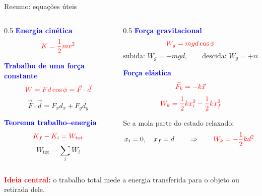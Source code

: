 \documentclass{beamer}
\begin{document}
	\begin{frame}{Resumo: equações úteis}
		\scriptsize
		
		\begin{columns}[T]
			\begin{column}{0.5\textwidth}
				\textcolor{blue}{\textbf{Energia cinética}}
				\[
				\textcolor{red}{K=\frac12mv^2}
				\]
				
				\textcolor{blue}{\textbf{Trabalho de uma força constante}}
				\[
				\textcolor{red}{W=Fd\cos\phi=\vec F\cdot\vec d}
				\]
				\[
				\vec F\cdot\vec d=F_xd_x+F_yd_y
				\]
				
				\textcolor{blue}{\textbf{Teorema trabalho--energia}}
				\[
				\textcolor{red}{K_f-K_i=W_{\text{tot}}}
				\]
				\[
				W_{\text{tot}}=\sum_i W_i
				\]
			\end{column}
			
			\begin{column}{0.5\textwidth}
				\textcolor{blue}{\textbf{Força gravitacional}}
				\[
				\textcolor{red}{W_g=mgd\cos\phi}
				\]
				\[
				\text{subida: } W_g=-mgd,
				\qquad
				\text{descida: } W_g=+mgd.
				\]
				
				\textcolor{blue}{\textbf{Força elástica}}
				\[
				\textcolor{red}{\vec F_k=-k\vec x}
				\]
				\[
				\textcolor{red}{W_k=\frac12kx_i^2-\frac12kx_f^2}
				\]
				
				Se a mola parte do estado relaxado:
				\[
				x_i=0,\quad x_f=d
				\qquad \Rightarrow \qquad
				\textcolor{red}{W_k=-\frac12kd^2.}
				\]
			\end{column}
		\end{columns}
		
		\vspace{0.15cm}
		\centering
		\textcolor{red}{\textbf{Ideia central:}} o trabalho total mede a energia transferida para o objeto ou retirada dele.
		
	\end{frame}
	
\end{document}
